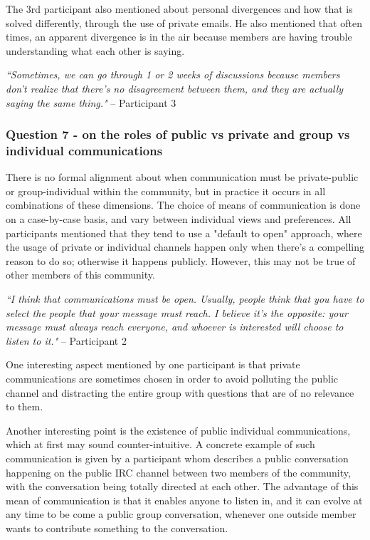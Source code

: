 \documentclass{sigchi}
\begin{document}
The 3rd participant also mentioned about personal divergences and how that is solved differently, through the use of private emails. He also mentioned that often times, an apparent divergence is in the air because members are having trouble understanding what each other is saying.

\begin{displayquote}
\textit{``Sometimes, we can go through 1 or 2 weeks of discussions because members don't realize that there's no disagreement between them, and they are actually saying the same thing."} – Participant 3
\end{displayquote}

\subsubsection{Question 7 - on the roles of public vs private and group vs individual communications}

There is no formal alignment about when communication must be private-public or group-individual within the community, but in practice it occurs in all combinations of these dimensions. The choice of means of communication is done on a case-by-case basis, and vary between individual views and preferences. All participants mentioned that they tend to use a "default to open" approach, where the usage of private or individual channels happen only when there's a compelling reason to do so; otherwise it happens publicly. However, this may not be true of other members of this community.

\begin{displayquote}
\textit{``I think that communications must be open. Usually, people think that you have to select the people that your message must reach. I believe it's the opposite: your message must always reach everyone, and whoever is interested will choose to listen to it."} – Participant 2
\end{displayquote}

One interesting aspect mentioned by one participant is that private communications are sometimes chosen in order to avoid polluting the public channel and distracting the entire group with questions that are of no relevance to them.

Another interesting point is the existence of public individual communications, which at first may sound counter-intuitive. A concrete example of such communication is given by a participant whom describes a public conversation happening on the public IRC channel between two members of the community, with the conversation being totally directed at each other. The advantage of this mean of communication is that it enables anyone to listen in, and it can evolve at any time to be come a public group conversation, whenever one outside member wants to contribute something to the conversation.
\end{document}
